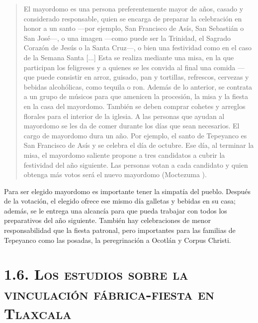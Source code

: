 \documentclass[14pt,letterpaper,twoside]{extbook} %
\begin{document}
\begin{quotation}
\noindent El mayordomo es una persona preferentemente mayor de  años, casado y considerado responsable, quien se encarga de preparar la celebración en honor a un santo ---por ejemplo, San Francisco de Asís, San Sebastián o San José---, o una imagen ---como puede ser la Trinidad, el Sagrado Corazón de Jesús o la Santa Cruz---, o bien una festividad como en el caso de la Semana Santa [...] Esta se realiza mediante una misa, en la que participan los feligreses y a quienes se les convida al final una comida ---que puede consistir en arroz, guisado, pan y tortillas, refrescos, cervezas y bebidas alcohólicas, como tequila o ron. Además de lo anterior, se contrata a un grupo de músicos para que amenicen la procesión, la misa y la fiesta en la casa del mayordomo. También se deben comprar cohetes y arreglos florales para el interior de la iglesia. A las personas que ayudan al mayordomo se les da de comer durante los días que sean necesarios. El cargo de mayordomo dura un año. Por ejemplo, el santo de Tepeyanco es San Francisco de Asís y se celebra el día  de octubre. Ese día, al terminar la misa, el mayordomo saliente propone a tres candidatos a cubrir la festividad del año siguiente. Las personas votan a cada candidato y quien obtenga más votos será el nuevo mayordomo (Moctezuma ).
\end{quotation}

\noindent Para ser elegido mayordomo es importante tener la simpatía del pueblo. Después de la votación, el elegido ofrece ese mismo día galletas y bebidas en su casa; además, se le entrega una alcancía para que pueda trabajar con todos los preparativos del año siguiente. También hay celebraciones de menor responsabilidad que la fiesta patronal, pero importantes para las familias de Tepeyanco como las posadas, la peregrinación a Ocotlán y Corpus Christi.

\section*{\mdseries\large\textsc{1.6. Los estudios sobre la vinculación fábrica-fiesta en Tlaxcala}}
\end{document}
